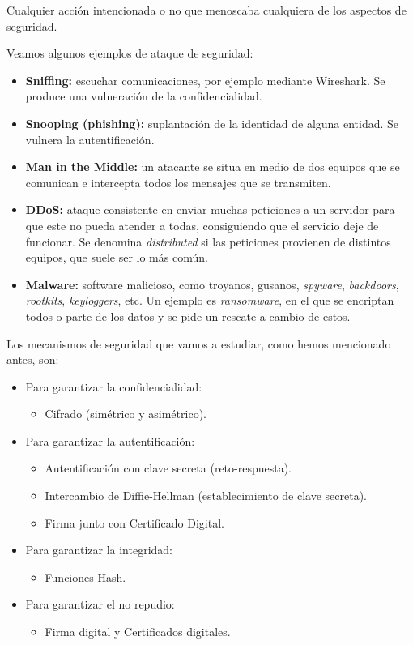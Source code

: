 \begin{definicion}
    Cualquier acción intencionada o no que menoscaba cualquiera de los aspectos de seguridad. 
\end{definicion}

Veamos algunos ejemplos de ataque de seguridad:
\begin{itemize}
    \item \textbf{Sniffing:} escuchar comunicaciones, por ejemplo mediante Wireshark. Se produce una vulneración de la confidencialidad.
    \item \textbf{Snooping (phishing):} suplantación de la identidad de alguna entidad. Se vulnera la autentificación.
    \item \textbf{Man in the Middle:} un atacante se situa en medio de dos equipos que se comunican e intercepta todos los mensajes que se transmiten.
    \item \textbf{\acrfull{DDoS}:} ataque consistente en enviar muchas peticiones a un servidor para que este no pueda atender a todas, consiguiendo que el servicio deje de funcionar. Se denomina \emph{distributed} si las peticiones provienen de distintos equipos, que suele ser lo más común. 
    \item \textbf{Malware:} software malicioso, como troyanos, gusanos, \textit{spyware}, \textit{backdoors}, \textit{rootkits}, \textit{keyloggers}, etc. Un ejemplo es \textit{ransomware}, en el que se encriptan todos o parte de los datos y se pide un rescate a cambio de estos.
\end{itemize}


Los mecanismos de seguridad que vamos a estudiar, como hemos mencionado antes, son:
\begin{itemize}
    \item Para garantizar la confidencialidad:
    \begin{itemize}
        \item Cifrado (simétrico y asimétrico).
    \end{itemize}
    \item Para garantizar la autentificación:
    \begin{itemize}
        \item Autentificación con clave secreta (reto-respuesta).
        \item Intercambio de Diffie-Hellman (establecimiento de clave secreta).
        \item Firma junto con Certificado Digital.
    \end{itemize}

    \item Para garantizar la integridad:
    \begin{itemize}
        \item Funciones Hash.
    \end{itemize}

    \item Para garantizar el no repudio:
    \begin{itemize}
        \item Firma digital y Certificados digitales.
    \end{itemize}
\end{itemize}


